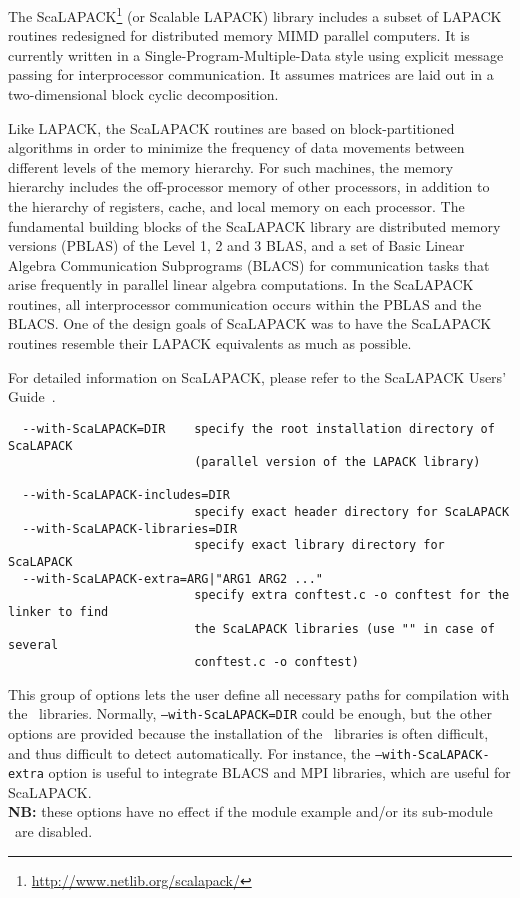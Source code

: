 \subsubsection{\scalapack}

The ScaLAPACK\footnote{\url{http://www.netlib.org/scalapack/}} (or
Scalable LAPACK) library includes a subset of LAPACK routines
redesigned for distributed memory MIMD parallel computers. It is
currently written in a Single-Program-Multiple-Data style using
explicit message passing for interprocessor communication. It assumes
matrices are laid out in a two-dimensional block cyclic decomposition.

Like LAPACK, the ScaLAPACK routines are based on block-partitioned
algorithms in order to minimize the frequency of data movements
between different levels of the memory hierarchy. For such machines,
the memory hierarchy includes the off-processor memory of other
processors, in addition to the hierarchy of registers, cache, and
local memory on each processor.  The fundamental building blocks of
the ScaLAPACK library are distributed memory versions (PBLAS) of the
Level 1, 2 and 3 BLAS, and a set of Basic Linear Algebra Communication
Subprograms (BLACS) for communication tasks that arise frequently in
parallel linear algebra computations. In the ScaLAPACK routines, all
interprocessor communication occurs within the PBLAS and the BLACS.
One of the design goals of ScaLAPACK was to have the ScaLAPACK
routines resemble their LAPACK equivalents as much as possible.

For detailed information on ScaLAPACK, please refer to the ScaLAPACK
Users' Guide~\cite{BCC+97}.


{\footnotesize
\begin{verbatim}
  --with-ScaLAPACK=DIR    specify the root installation directory of ScaLAPACK
                          (parallel version of the LAPACK library)

  --with-ScaLAPACK-includes=DIR
                          specify exact header directory for ScaLAPACK
  --with-ScaLAPACK-libraries=DIR
                          specify exact library directory for ScaLAPACK
  --with-ScaLAPACK-extra=ARG|"ARG1 ARG2 ..."
                          specify extra conftest.c -o conftest for the linker to find 
                          the ScaLAPACK libraries (use "" in case of several 
                          conftest.c -o conftest)
\end{verbatim}
}

\noindent This group of options lets the user define all necessary
paths for compilation with the \scalapack\ libraries. Normally,
\texttt{--with-ScaLAPACK=DIR} could be enough, but the other options
are provided because the installation of the \scalapack\ libraries is
often difficult, and thus difficult to detect automatically. For
instance, the \texttt{--with-ScaLAPACK-extra} option is useful to
integrate BLACS and MPI libraries, which are useful for ScaLAPACK.  \\
\textbf{NB:} these options have no effect if the module example and/or
its sub-module \scalapack\ are disabled.

